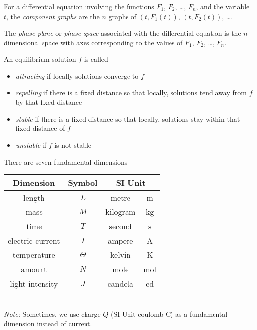 \begin{SaveDefinition}[key=ComponentGraphAndPhasePlane, title={Component Graph \& Phase Plane}]
	For a differential equation involving the functions $F_1$, $F_2$, \ldots, $F_n$, and the variable $t$,
	the \emph{component graphs} are the $n$ graphs of $(t, F_1(t))$, $(t, F_2(t))$, \ldots.
	
	The \emph{phase plane} or \emph{phase space} associated with the differential equation
	is the $n$-dimensional space with axes corresponding to
	the values of $F_1$, $F_2$, \ldots, $F_n$.
\end{SaveDefinition}

\begin{SaveDefinition}[key=ClassificationOfEquilibria, title={Classification of Equilibria}]
		An equilibrium solution $f$ is called
		\begin{itemize}
			\item \emph{attracting} if locally solutions converge to $f$
			\item \emph{repelling} if there is a fixed distance so that locally, solutions tend away from $f$ by that fixed distance
			\item \emph{stable} if there is a fixed distance so that locally, solutions stay within that fixed distance of $f$
			\item \emph{unstable} if $f$ is not stable
		\end{itemize}
\end{SaveDefinition}


\begin{SaveDefinition}[key=FundamentalDimensions, title={Seven Fundamental Dimensions}]

There are seven fundamental dimensions: \\

\begin{tabular}{cccc}
Dimension & Symbol & \multicolumn{2}{c}{SI Unit}   \\ \hline
length & $L$ & metre & m \\
mass & $M$ & kilogram & kg \\
time & $T$ & second & s \\
electric current & $I$ & ampere & A \\
temperature & $\Theta$ & kelvin & K \\
amount & $N$ & mole & mol \\
light intensity & $J$ & candela & cd
\end{tabular} \\

\textit{Note: } Sometimes, we use charge $Q$ (SI Unit coulomb C) as a fundamental dimension instead of current.
\end{SaveDefinition}


